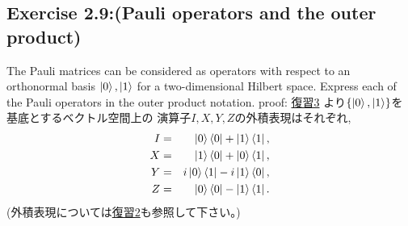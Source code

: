 \begin{flushleft}
\section{\Large Exercise 2.9:(Pauli operators and the outer product)}
The Pauli matrices can be considered as operators with respect to an orthonormal
basis $\ket{0}, \ket{1}$ for a two-dimensional Hilbert space.
Express each of the Pauli operators in the outer product notation.
\newline
{\large proof:}
\hyperlink{hukushuu3}{復習3} 
より$\{\ket{0}, \ket{1}\}$を基底とするベクトル空間上の
演算子$I, X, Y, Z$の外積表現はそれぞれ,
\begin{eqnarray*}
I &=& \ket{0}\bra{0} + \ket{1}\bra{1},\\
X &=& \ket{1}\bra{0} + \ket{0}\bra{1},\\
Y &=& i\ket{0}\bra{1} - i \ket{1}\bra{0},\\
Z &=& \ket{0}\bra{0} -  \ket{1}\bra{1}.
\end{eqnarray*}
(外積表現については\hyperlink{hukushuu2}{復習2}も参照して下さい。)
\end{flushleft}
